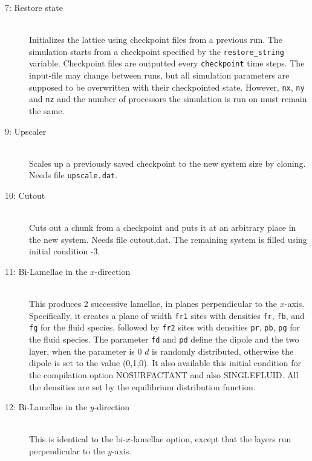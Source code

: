 \documentclass[a4paper]{article}
\begin{document}
\begin{description}


\item[7: Restore state]\ \\
   Initializes the lattice using checkpoint files from a previous run. The
   simulation starts from a checkpoint specified by the {\tt restore\_string}
   variable.  Checkpoint files are outputted every {\tt checkpoint} time
   steps. The input-file may change between runs, but all simulation
   parameters are supposed to be overwritten with their checkpointed
   state. However, {\tt nx}, {\tt ny} and {\tt nz} and the number of
   processors the simulation is run on must remain the same.

\item[9: Upscaler]\ \\
  Scales up a previously saved checkpoint to the new system size by
  cloning. Needs file {\tt upscale.dat}.

\item[10: Cutout]\ \\
   Cuts out a chunk from a checkpoint and puts it at an arbitrary place in the
   new system. Needs file cutout.dat. The remaining system is filled using
   initial condition -3.

 \item[11: Bi-Lamellae in the $x$-direction]\ \\
   This produces 2 successive lamellae, in planes perpendicular to the
   $x$-axis.  Specifically, it creates a plane of width {\tt fr1} sites with
   densities {\tt fr}, {\tt fb}, and {\tt fg} for the fluid species, followed
   by {\tt fr2} sites with densities {\tt pr}, {\tt pb}, {\tt pg} for the
   fluid species. The parameter {\tt fd} and {\tt pd} define the dipole and
   the two layer, when the parameter is 0 $d$ is randomly distributed,
   otherwise the dipole is set to the value (0,1,0). It also available this
   initial condition for the compilation option NOSURFACTANT and also
   SINGLEFLUID. All the densities are set by the equilibrium distribution
   function.

\item[12: Bi-Lamellae in the $y$-direction]\ \\
  This is identical to the bi-$x$-lamellae option, except that the layers run
  perpendicular to the $y$-axis.


\end{description}
\end{document}
